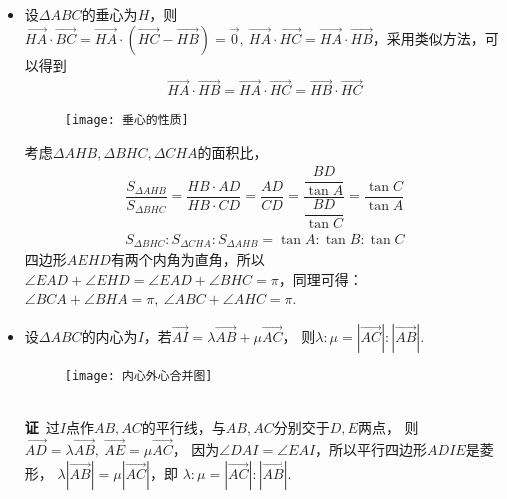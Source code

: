 \begin{itemize}[leftmargin=\inteval{\myitemleftmargin}pt,itemsep=
   \inteval{\myitemitempsep}pt,topsep=\inteval{\myitemtopsep}pt]
\item 设$ \Delta ABC $的垂心为$ H $，则$ \vec{HA}\cdot \vec{BC}=
\vec{HA}\cdot (\vec{HC}-\vec{HB})=
\vec{0},\ \vec{HA}\cdot \vec{HC}=
\vec{HA}\cdot \vec{HB} $，采用类似方法，可以得到
\begin{align}\label{垂心性质三个连等式}
    \vec{HA}\cdot \vec{HB}=
    \vec{HA}\cdot \vec{HC}=\vec{HB}\cdot \vec{HC} 
\end{align}
\begin{figure}[h]
    \centering
    \texttt{[image: 垂心的性质]}
\end{figure}
考虑$ \Delta AHB,\Delta BHC,\Delta CHA $的面积比，
\begin{gather*}
    \dfrac{S_{\Delta AHB}}{S_{\Delta BHC}}=\dfrac{HB\cdot AD}
    {HB \cdot CD}=\dfrac{AD}{CD}=\dfrac{\dfrac{BD}{\tan A}}
    {\dfrac{BD}{\tan C}}=\dfrac{\tan C}{\tan A} \\
    S_{\Delta BHC}:S_{\Delta CHA}:S_{\Delta AHB}= \tan A:\tan B:\tan C
\end{gather*}
四边形$ AEHD $有两个内角为直角，所以$ \angle EAD+\angle EHD=\angle EAD
+\angle BHC =\pi $，同理可得：
$ \angle BCA+\angle BHA =\pi,\ \angle ABC+\angle AHC =\pi $. 

\item 设$ \Delta ABC $的内心为$ I $，若$ \vec{AI}=\lambda\vec{AB}+\mu\vec{AC} $，
则$ \lambda:\mu=|\vec{AC}|:|\vec{AB}| $. 
\begin{figure}[h]
    \centering
    \texttt{[image: 内心外心合并图]}
\end{figure}
\\
\textbf{证}\ 过$ I $点作$ AB,AC $的平行线，与$ AB,AC $分别交于$ D,E $两点，
则$ \vec{AD}=\lambda\vec{AB},\ 
\vec{AE}=\mu\vec{AC} $，
因为$ \angle DAI=\angle EAI $，所以平行四边形$ ADIE $是菱形，
$ \lambda|\vec{AB}|=\mu|\vec{AC}| $，即
$ \lambda:\mu=|\vec{AC}|:|\vec{AB}| $. 


\end{itemize}
